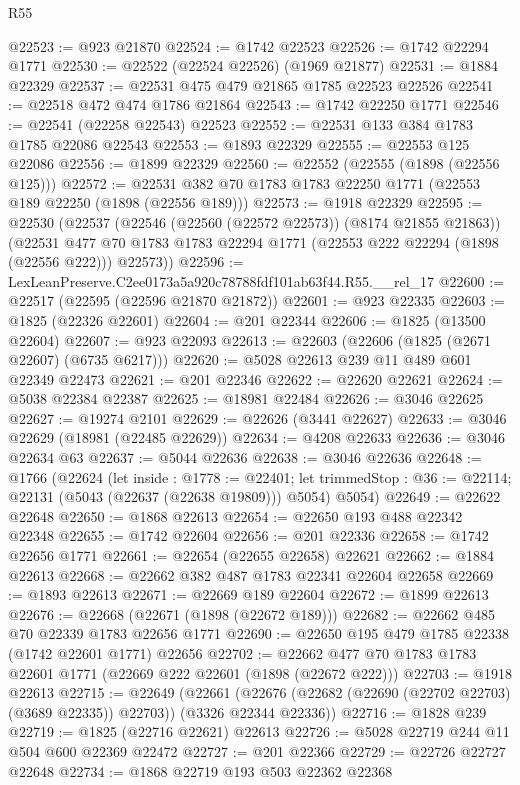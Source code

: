 \begin{lexlean}{R55}
\begin{coremodule}
@22523 := @923 @21870
@22524 := @1742 @22523
@22526 := @1742 @22294 @1771
@22530 := @22522 (@22524 @22526) (@1969 @21877)
@22531 := @1884 @22329
@22537 := @22531 @475 @479 @21865 @1785 @22523 @22526
@22541 := @22518 @472 @474 @1786 @21864
@22543 := @1742 @22250 @1771
@22546 := @22541 (@22258 @22543) @22523
@22552 := @22531 @133 @384 @1783 @1785 @22086 @22543
@22553 := @1893 @22329
@22555 := @22553 @125 @22086
@22556 := @1899 @22329
@22560 := @22552 (@22555 (@1898 (@22556 @125)))
@22572 := @22531 @382 @70 @1783 @1783 @22250 @1771 (@22553 @189 @22250 (@1898 (@22556 @189)))
@22573 := @1918 @22329
@22595 := @22530
    (@22537
      (@22546 (@22560 (@22572 @22573)) (@8174 @21855 @21863))
      (@22531 @477 @70 @1783 @1783 @22294 @1771 (@22553 @222 @22294 (@1898 (@22556 @222))) @22573))
@22596 := LexLeanPreserve.C2ee0173a5a920c78788fdf101ab63f44.R55.__rel_17
@22600 := @22517 (@22595 (@22596 @21870 @21872))
@22601 := @923 @22335
@22603 := @1825 (@22326 @22601)
@22604 := @201 @22344
@22606 := @1825 (@13500 @22604)
@22607 := @923 @22093
@22613 := @22603 (@22606 (@1825 (@2671 @22607) (@6735 @6217)))
@22620 := @5028 @22613 @239 @11 @489 @601 @22349 @22473
@22621 := @201 @22346
@22622 := @22620 @22621
@22624 := @5038 @22384 @22387
@22625 := @18981 @22484
@22626 := @3046 @22625
@22627 := @19274 @2101
@22629 := @22626 (@3441 @22627)
@22633 := @3046 @22629 (@18981 (@22485 @22629))
@22634 := @4208 @22633
@22636 := @3046 @22634 @63
@22637 := @5044 @22636
@22638 := @3046 @22636
@22648 := @1766
    (@22624
      (let inside : @1778 := @22401;
      let trimmedStop : @36 := @22114; @22131 (@5043 (@22637 (@22638 @19809))) @5054)
      @5054)
@22649 := @22622 @22648
@22650 := @1868 @22613
@22654 := @22650 @193 @488 @22342 @22348
@22655 := @1742 @22604
@22656 := @201 @22336
@22658 := @1742 @22656 @1771
@22661 := @22654 (@22655 @22658) @22621
@22662 := @1884 @22613
@22668 := @22662 @382 @487 @1783 @22341 @22604 @22658
@22669 := @1893 @22613
@22671 := @22669 @189 @22604
@22672 := @1899 @22613
@22676 := @22668 (@22671 (@1898 (@22672 @189)))
@22682 := @22662 @485 @70 @22339 @1783 @22656 @1771
@22690 := @22650 @195 @479 @1785 @22338 (@1742 @22601 @1771) @22656
@22702 := @22662 @477 @70 @1783 @1783 @22601 @1771 (@22669 @222 @22601 (@1898 (@22672 @222)))
@22703 := @1918 @22613
@22715 := @22649
    (@22661 (@22676 (@22682 (@22690 (@22702 @22703) (@3689 @22335)) @22703)) (@3326 @22344 @22336))
@22716 := @1828 @239
@22719 := @1825 (@22716 @22621) @22613
@22726 := @5028 @22719 @244 @11 @504 @600 @22369 @22472
@22727 := @201 @22366
@22729 := @22726 @22727 @22648
@22734 := @1868 @22719 @193 @503 @22362 @22368

\end{coremodule}
\end{lexlean}
